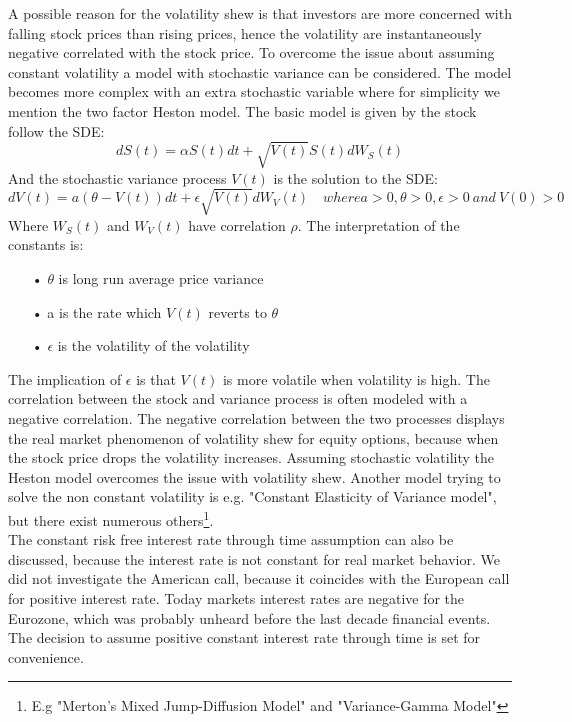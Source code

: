 A possible reason for the volatility shew is that investors are more concerned with falling stock prices than rising prices, hence the volatility are instantaneously negative correlated with the stock price. To overcome the issue about assuming constant volatility a model with stochastic variance can be considered. The model becomes more complex with an extra stochastic variable where for simplicity we mention the two factor Heston model. The basic model is given by the stock follow the SDE:
$$dS(t)=\alpha S(t) dt + \sqrt{V(t)} S(t) dW_S(t)$$
And the stochastic variance process $V(t)$ is the solution to the SDE:
$$dV(t)=a(\theta - V(t))dt + \epsilon \sqrt{V(t)} dW_V(t) \quad where a>0,\theta>0, \epsilon>0 \ and \ V(0)>0$$
Where $W_S(t)$ and $W_V(t)$ have correlation $\rho$. The interpretation of the constants is:
\begin{enumerate}
\item[•] $\theta$ is long run average price variance
\item[•] a is the rate which $V(t)$ reverts to $\theta$
\item[•] $\epsilon$ is the volatility of the volatility
\end{enumerate} 
The implication of $\epsilon$ is that $V(t)$ is more volatile when volatility is high. The correlation between the stock and variance process is often modeled with a negative correlation. The negative correlation between the two processes displays the real market phenomenon of volatility shew for equity options, because when the stock price drops the volatility increases. Assuming stochastic volatility the Heston model overcomes the issue with volatility shew. Another model trying to solve the non constant volatility is e.g. "Constant Elasticity of Variance model", but there exist numerous others\footnote{E.g "Merton's Mixed Jump-Diffusion Model" and "Variance-Gamma Model"}. \\

The constant risk free interest rate through time assumption can also be discussed, because the interest rate is not constant for real market behavior. We did not investigate the American call, because it coincides with the European call for positive interest rate. Today markets interest rates are negative for the Eurozone, which was probably unheard before the last decade financial events. The decision to assume positive constant interest rate through time is set for convenience.\\

